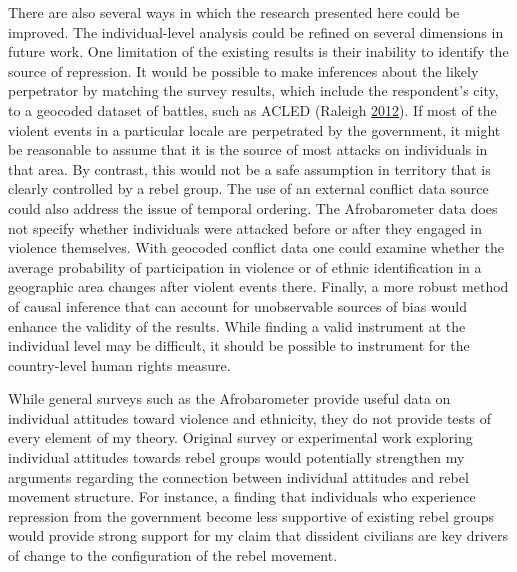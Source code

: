 \documentclass[12pt,]{book}
\theoremstyle{definition}
\theoremstyle{definition}
\theoremstyle{definition}
\theoremstyle{remark}
\begin{document}
There are also several ways in which the research presented here could
be improved. The individual-level analysis could be refined on several
dimensions in future work. One limitation of the existing results is
their inability to identify the source of repression. It would be
possible to make inferences about the likely perpetrator by matching the
survey results, which include the respondent's city, to a geocoded
dataset of battles, such as ACLED (Raleigh
\protect\hyperlink{ref-Raleigh2012a}{2012}). If most of the violent
events in a particular locale are perpetrated by the government, it
might be reasonable to assume that it is the source of most attacks on
individuals in that area. By contrast, this would not be a safe
assumption in territory that is clearly controlled by a rebel group. The
use of an external conflict data source could also address the issue of
temporal ordering. The Afrobarometer data does not specify whether
individuals were attacked before or after they engaged in violence
themselves. With geocoded conflict data one could examine whether the
average probability of participation in violence or of ethnic
identification in a geographic area changes after violent events there.
Finally, a more robust method of causal inference that can account for
unobservable sources of bias would enhance the validity of the results.
While finding a valid instrument at the individual level may be
difficult, it should be possible to instrument for the country-level
human rights measure.

While general surveys such as the Afrobarometer provide useful data on
individual attitudes toward violence and ethnicity, they do not provide
tests of every element of my theory. Original survey or experimental
work exploring individual attitudes towards rebel groups would
potentially strengthen my arguments regarding the connection between
individual attitudes and rebel movement structure. For instance, a
finding that individuals who experience repression from the government
become less supportive of existing rebel groups would provide strong
support for my claim that dissident civilians are key drivers of change
to the configuration of the rebel movement.
\end{document}
